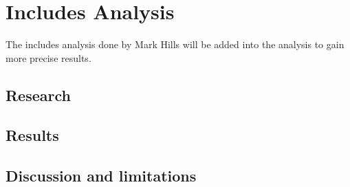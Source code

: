 \documentclass[../main.tex]{subfiles}
\begin{document}
    \chapter{Includes Analysis}\label{chap:includes_analysis}
        The includes analysis done by Mark Hills will be added into the analysis to gain more precise results.
    
    \section{Research}\label{sec:ia_research}

    \section{Results}\label{sec:ia_results}

    \section{Discussion and limitations}\label{sec:ia_discussion}
\end{document}
